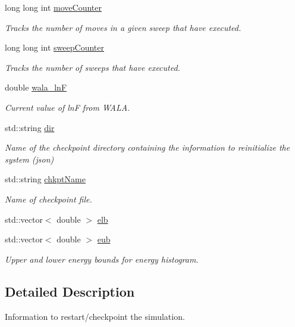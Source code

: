 \begin{DoxyCompactItemize}
long long int \hyperlink{classcheckpoint_a5ab49a355714da4874aba00eb03f701d}{move\-Counter}
\begin{DoxyCompactList}\small\item\em Tracks the number of moves in a given sweep that have executed. \end{DoxyCompactList}\item 
long long int \hyperlink{classcheckpoint_ad011ddbca1ea708321335b1b3ac67e07}{sweep\-Counter}
\begin{DoxyCompactList}\small\item\em Tracks the number of sweeps that have executed. \end{DoxyCompactList}\item 
double \hyperlink{classcheckpoint_a34dc9c1711a8b4f9986a7a2c41b9dcd1}{wala\-\_\-ln\-F}
\begin{DoxyCompactList}\small\item\em Current value of ln\-F from W\-A\-L\-A. \end{DoxyCompactList}\item 
std\-::string \hyperlink{classcheckpoint_a0e0f999ee8e0b09541e9131baa8a591d}{dir}
\begin{DoxyCompactList}\small\item\em Name of the checkpoint directory containing the information to reinitialize the system (json) \end{DoxyCompactList}\item 
std\-::string \hyperlink{classcheckpoint_a477eea21621f066889660ed426dc800f}{chkpt\-Name}
\begin{DoxyCompactList}\small\item\em Name of checkpoint file. \end{DoxyCompactList}\item 
std\-::vector$<$ double $>$ \hyperlink{classcheckpoint_a2338cb624f19eb6776c10f9bb83b2a5d}{elb}
\item 
std\-::vector$<$ double $>$ \hyperlink{classcheckpoint_a7071b01d0936873321d0a706e761b6ac}{eub}
\begin{DoxyCompactList}\small\item\em Upper and lower energy bounds for energy histogram. \end{DoxyCompactList}\end{DoxyCompactItemize}


\subsection{Detailed Description}
Information to restart/checkpoint the simulation. 


